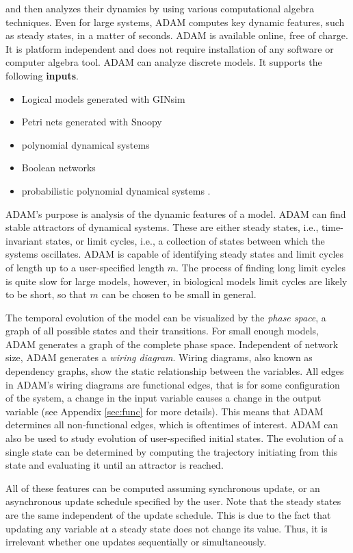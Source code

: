 \documentclass[11pt]{amsart}
\begin{document}
and then analyzes their dynamics by using various computational algebra techniques. Even for large systems, ADAM
computes key dynamic features, such as steady states, in a matter of seconds.
ADAM is available online, free of charge. It is platform
independent and does not require installation of any software or computer
algebra tool.
ADAM can analyze discrete models. It supports the following {\bf inputs}.
\begin{itemize}
\item Logical models generated with GINsim \cite{GINsim}
\item Petri nets generated with Snoopy \cite{Snoopy}
\item polynomial dynamical systems
\item Boolean networks
\item probabilistic polynomial dynamical systems \cite{shmulevich}.
\end{itemize}
ADAM’s purpose is analysis of the dynamic features of a model. ADAM can find stable attractors of dynamical systems. These are either steady states, i.e., time-invariant states,
or limit cycles, i.e., a collection of states between which the systems oscillates. ADAM is capable of identifying steady states and limit cycles of length up to a user-specified length $m$. The process of finding long limit cycles is quite slow for large models, however, in biological models limit cycles are likely to be short, so that $m$ can be chosen to be small in general.
 
The temporal evolution of the model can be visualized by the {\it phase space}, a graph of all possible states and their transitions. For small enough models, ADAM generates a graph of the complete phase space. Independent of network size, ADAM generates a {\it wiring diagram}. Wiring diagrams, also known as dependency graphs, show the static relationship between the variables. All edges in ADAM’s wiring diagrams are functional edges, that is for some configuration of the system, a change in the input variable causes a change in the output variable (see Appendix \ref{sec:func} for more details). This means that ADAM determines all non-functional edges, which is oftentimes of interest.
ADAM can also be used to study evolution of user-specified initial states. The evolution of a single state can be determined by computing the trajectory initiating from this state and evaluating it until an attractor is reached.
 
All of these features can be computed assuming synchronous update, or an asynchronous update schedule specified by the user. Note that the steady states are the same independent of the update schedule. This is due to the fact that updating any variable at a steady state does not change its value. Thus, it is irrelevant whether one updates sequentially or simultaneously.  
 
\end{document}
